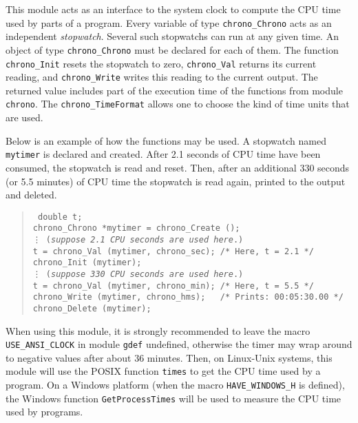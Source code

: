 
This module acts as an interface to the system clock to compute the
CPU time used by parts of a program.
Every variable of type {\tt chrono\_Chrono} acts as an independent 
{\em stopwatch}.  Several such stopwatchs can run at any given time.
An object of type {\tt chrono\_Chrono} must be declared 
for each of them.
The function {\tt chrono\_Init} resets the stopwatch to zero,
{\tt chrono\_Val\/} returns its current reading,
and {\tt chrono\_Write\/} writes this reading to the current output.
The returned value includes part of the execution time of the functions
from module {\tt chrono\/}.
The {\tt chrono\_TimeFormat} allows one to choose the kind of 
time units that are used.  

Below is an example of how the functions may be used.
A stopwatch named {\tt mytimer} is declared and created.
After 2.1 seconds of CPU time have been consumed, the stopwatch is read and
reset. Then, after an additional 330 seconds (or 5.5 minutes) of CPU time
the stopwatch is read again, printed to the output and deleted.
%
 \begin{verse}{\tt
  double t; \\
  chrono\_Chrono *mytimer = chrono\_Create (); \\
\hskip 1.0cm   \vdots 
\hskip 1.0cm  ({\em suppose 2.1 CPU seconds are used here}.)\\[6pt]
  t = chrono\_Val (mytimer, chrono\_sec); \qquad   /* Here, t = 2.1 */ \\
  chrono\_Init (mytimer); \\
\hskip 1.0cm  \vdots
\hskip 1.0cm ({\em suppose 330 CPU seconds are used here}.) \\[10pt]
  t = chrono\_Val (mytimer, chrono\_min); \qquad    /* Here, t = 5.5 */\\
  chrono\_Write (mytimer, chrono\_hms);  \qquad\ \  /* Prints: 00:05:30.00 */\\
  chrono\_Delete (mytimer);
 }\end{verse}

When using this module, it is strongly recommended to leave the macro {\tt USE\_ANSI\_CLOCK} 
in module {\tt gdef} undefined, otherwise the timer may %
wrap around to negative values after about 36 minutes.
  Then, on Linux-Unix systems, this module will use the POSIX
  function {\tt times} to get the CPU time used by a program.
  On a Windows platform (when the macro \texttt{HAVE\_WINDOWS\_H} is defined),
  the Windows function \texttt{GetProcessTimes} will be used to measure
  the CPU time used by programs.


